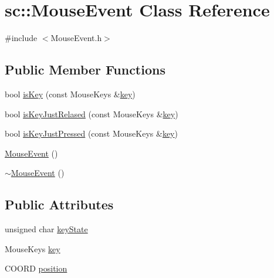 \hypertarget{classsc_1_1_mouse_event}{}\section{sc\+::Mouse\+Event Class Reference}
\label{classsc_1_1_mouse_event}


{\ttfamily \#include $<$Mouse\+Event.\+h$>$}

\subsection*{Public Member Functions}
\begin{DoxyCompactItemize}
\item 
bool \mbox{\hyperlink{classsc_1_1_mouse_event_a4547feedfd0a8ff93a86e8a2ed7d7fb2}{is\+Key}} (const Mouse\+Keys \&\mbox{\hyperlink{classsc_1_1_mouse_event_abc093db96c5a782e4693fa736d2f523b}{key}})
\item 
bool \mbox{\hyperlink{classsc_1_1_mouse_event_abdfb452eb9ed6b925c2918e725b6b479}{is\+Key\+Just\+Relased}} (const Mouse\+Keys \&\mbox{\hyperlink{classsc_1_1_mouse_event_abc093db96c5a782e4693fa736d2f523b}{key}})
\item 
bool \mbox{\hyperlink{classsc_1_1_mouse_event_a290a2139c0e97c3d7d805ce456c2f07e}{is\+Key\+Just\+Pressed}} (const Mouse\+Keys \&\mbox{\hyperlink{classsc_1_1_mouse_event_abc093db96c5a782e4693fa736d2f523b}{key}})
\item 
\mbox{\hyperlink{classsc_1_1_mouse_event_abc4315e7f7d9359fb17eaa066f6a4d13}{Mouse\+Event}} ()
\item 
\mbox{\hyperlink{classsc_1_1_mouse_event_a964b5fc17ddbe6c98884c375d8f982b7}{$\sim$\+Mouse\+Event}} ()
\end{DoxyCompactItemize}
\subsection*{Public Attributes}
\begin{DoxyCompactItemize}
\item 
unsigned char \mbox{\hyperlink{classsc_1_1_mouse_event_a4b61d90171ffd4c3a199d2d76bd237d0}{key\+State}}
\item 
Mouse\+Keys \mbox{\hyperlink{classsc_1_1_mouse_event_abc093db96c5a782e4693fa736d2f523b}{key}}
\item 
C\+O\+O\+RD \mbox{\hyperlink{classsc_1_1_mouse_event_ab1b41d159d16878287fdef8f625c8939}{position}}
\end{DoxyCompactItemize}


